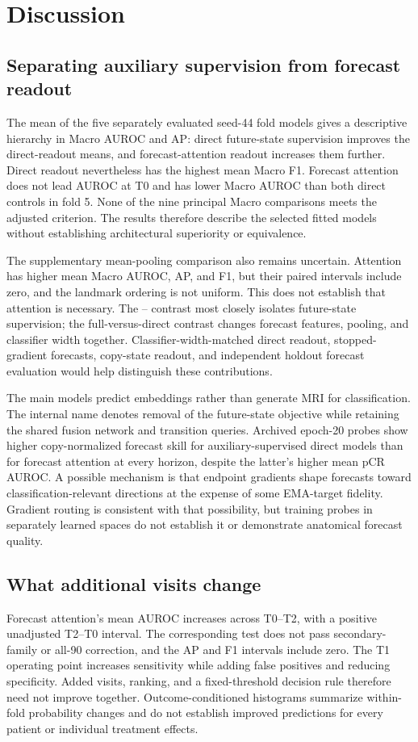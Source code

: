 \section{Discussion}
\label{sec:discussion}
\subsection{Separating auxiliary supervision from forecast readout}
The mean of the five separately evaluated seed-44 fold models gives a descriptive hierarchy in Macro AUROC and AP: direct future-state supervision improves the direct-readout means, and forecast-attention readout increases them further. Direct readout nevertheless has the highest mean Macro F1. Forecast attention does not lead AUROC at T0 and has lower Macro AUROC than both direct controls in fold 5. None of the nine principal Macro comparisons meets the adjusted criterion. The results therefore describe the selected fitted models without establishing architectural superiority or equivalence.

The supplementary mean-pooling comparison also remains uncertain. Attention has higher mean Macro AUROC, AP, and F1, but their paired intervals include zero, and the landmark ordering is not uniform. This does not establish that attention is necessary. The \direct{}--\nojepa{} contrast most closely isolates future-state supervision; the full-versus-direct contrast changes forecast features, pooling, and classifier width together. Classifier-width-matched direct readout, stopped-gradient forecasts, copy-state readout, and independent holdout forecast evaluation would help distinguish these contributions.

The main models predict embeddings rather than generate MRI for classification. The internal name \nojepa{} denotes removal of the future-state objective while retaining the shared fusion network and transition queries. Archived epoch-20 probes show higher copy-normalized forecast skill for auxiliary-supervised direct models than for forecast attention at every horizon, despite the latter's higher mean pCR AUROC. A possible mechanism is that endpoint gradients shape forecasts toward classification-relevant directions at the expense of some EMA-target fidelity. Gradient routing is consistent with that possibility, but training probes in separately learned spaces do not establish it or demonstrate anatomical forecast quality.

\subsection{What additional visits change}
Forecast attention's mean AUROC increases across T0--T2, with a positive unadjusted T2--T0 interval. The corresponding test does not pass secondary-family or all-90 correction, and the AP and F1 intervals include zero. The T1 operating point increases sensitivity while adding false positives and reducing specificity. Added visits, ranking, and a fixed-threshold decision rule therefore need not improve together. Outcome-conditioned histograms summarize within-fold probability changes and do not establish improved predictions for every patient or individual treatment effects.

